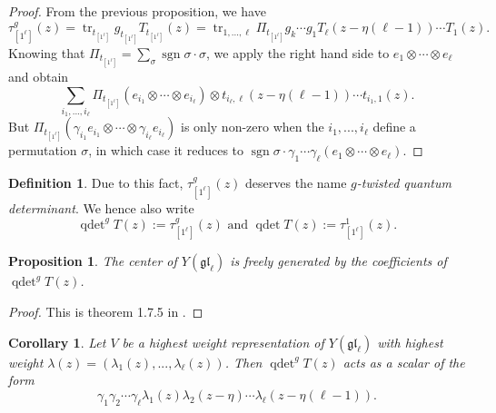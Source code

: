 \documentclass[11pt]{report}
\newtheorem{prop}[theorem]{Proposition}
\newtheorem{corollary}[theorem]{Corollary}
\theoremstyle{definition}
\newtheorem{definition}[theorem]{Definition}
\theoremstyle{remark}
\theoremstyle{remark}
\begin{document}
\begin{proof}
From the previous proposition, we have
\begin{equation*}
\tau_{[1^\ell]}^g(z) = \operatorname{tr}_{t_{[1^\ell]}} g_{t_{[1^\ell]}} T_{t_{[1^\ell]}}(z) = \operatorname{tr}_{1,...,\ell} \Pi_{t_{[1^\ell]}} g_k \cdots g_1 T_\ell(z-\eta(\ell-1)) \cdots T_1(z).
\end{equation*}
Knowing that $\Pi_{t_{[1^\ell]}} = \sum_\sigma \operatorname{sgn} \sigma \cdot \sigma$, we apply the right hand side to $e_1 \otimes \cdots \otimes e_\ell$ and obtain
\begin{equation*}
\sum_{i_1,...,i_\ell} \Pi_{t_{[1^\ell]}} (e_{i_1} \otimes \cdots \otimes e_{i_\ell}) \otimes t_{i_\ell,\ell}(z-\eta(\ell-1)) \cdots t_{i_1,1}(z).
\end{equation*}
But $\Pi_{t_{[1^\ell]}} (\gamma_{i_1} e_{i_1} \otimes \cdots \otimes \gamma_{i_\ell} e_{i_\ell})$ is only non-zero when the $i_1,...,i_\ell$ define a permutation $\sigma$, in which case it reduces to $\operatorname{sgn} \sigma \cdot \gamma_1 \cdots \gamma_\ell (e_1 \otimes \cdots \otimes e_\ell)$.
\end{proof}

\begin{definition}
Due to this fact, $\tau_{[1^\ell]}^g(z)$ deserves the name \emph{$g$-twisted quantum determinant}. We hence also write 
\begin{equation*}
\operatorname{qdet}^g T(z) := \tau_{[1^\ell]}^g(z) \text{ and } \operatorname{qdet} T(z) := \tau_{[1^\ell]}^1(z).
\end{equation*}
\end{definition}

\begin{prop}
The center of $Y(\mathfrak{gl}_\ell)$ is freely generated by the coefficients of $\operatorname{qdet}^g T(z)$.
\end{prop}

\begin{proof}
This is theorem 1.7.5 in \cite{book:molev}.
\end{proof}

\begin{corollary}\label{corollary:quantumDet}
Let $V$ be a highest weight representation of $Y(\mathfrak{gl}_\ell)$ with highest weight $\lambda(z) = (\lambda_1(z),...,\lambda_\ell(z))$. Then $\operatorname{qdet}^g T(z)$ acts as a scalar of the form
\begin{equation*}
\gamma_1 \gamma_2 \cdots \gamma_\ell \lambda_1(z) \lambda_2(z-\eta) \cdots \lambda_\ell(z-\eta(\ell-1)).
\end{equation*}
\end{corollary}
\end{document}
